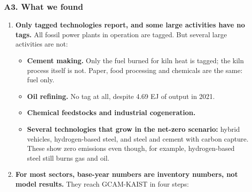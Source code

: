 \hypertarget{a3.-what-we-found}{%
\subsubsection{A3.
What we
found}\label{a3.-what-we-found}}

\begin{enumerate}
\def\labelenumi{\arabic{enumi}.}
\tightlist
\item
  \textbf{Only
  tagged
  technologies
  report,
  and some
  large
  activities
  have no
  tags.}
  All
  fossil
  power
  plants
  in
  operation
  are
  tagged.
  But
  several
  large
  activities
  are not:

  \begin{itemize}
  \tightlist
  \item
    \textbf{Cement
    making.}
    Only
    the
    fuel
    burned
    for
    kiln
    heat
    is
    tagged;
    the
    kiln
    process
    itself
    is
    not.
    Paper,
    food
    processing
    and
    chemicals
    are
    the
    same:
    fuel
    only.
  \item
    \textbf{Oil
    refining.}
    No tag
    at
    all,
    despite
    4.69
    EJ of
    output
    in
    2021.
  \item
    \textbf{Chemical
    feedstocks
    and
    industrial
    cogeneration.}
  \item
    \textbf{Several
    technologies
    that
    grow
    in the
    net-zero
    scenario:}
    hybrid
    vehicles,
    hydrogen-based
    steel,
    and
    steel
    and
    cement
    with
    carbon
    capture.
    These
    show
    zero
    emissions
    even
    though,
    for
    example,
    hydrogen-based
    steel
    still
    burns
    gas
    and
    oil.
  \end{itemize}
\item
  \textbf{For most sectors, base-year numbers are inventory numbers, not model
  results.} They reach GCAM-KAIST in four steps:


\end{enumerate}
